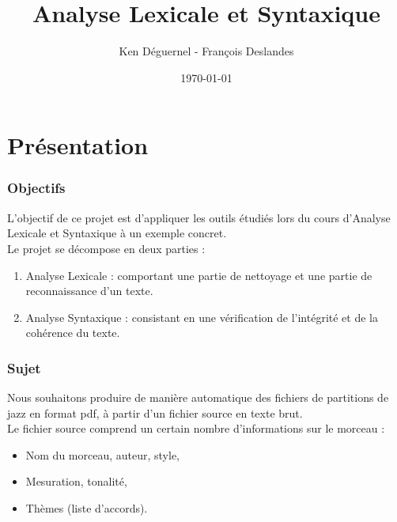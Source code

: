 \documentclass{beamer}
\begin{document}
\title{Analyse Lexicale et Syntaxique\\
	   } 
\author{Ken Déguernel - François Deslandes} 
\date{\today} 

\frame{\titlepage} 



\section{Présentation} 
\begin{frame}
\frametitle{Objectifs}
L'objectif de ce projet est d'appliquer les outils étudiés lors du cours d'Analyse Lexicale et Syntaxique à un exemple concret.\\
Le projet se décompose en deux parties :
\begin{enumerate}
\item Analyse Lexicale : comportant une partie de nettoyage et une partie de reconnaissance d'un texte. \\
\item Analyse Syntaxique : consistant en une vérification de l'intégrité et de la cohérence du texte. \\
\end{enumerate}
\end{frame}

\begin{frame}
\frametitle{Sujet}
Nous souhaitons produire de manière automatique des fichiers de partitions de jazz en format pdf, à partir d'un fichier source en texte brut.\\
Le fichier source comprend un certain nombre d'informations sur le morceau :
\begin{itemize}
\item Nom du morceau, auteur, style,
\item Mesuration, tonalité,
\item Thèmes (liste d'accords).
\end{itemize}
\end{frame}
\end{document}
